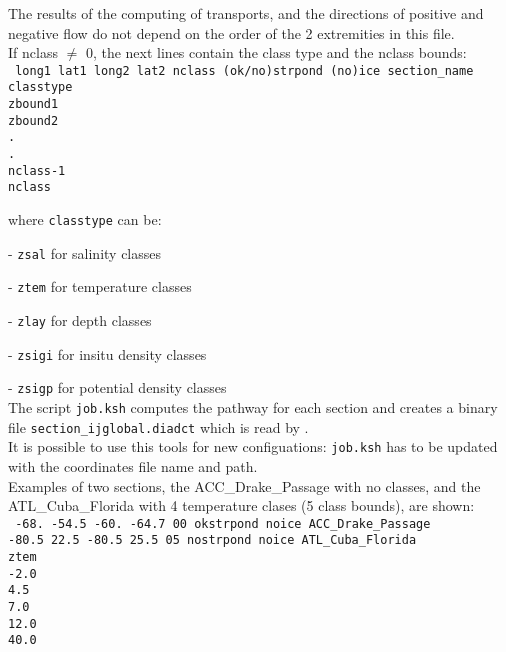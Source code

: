 \documentclass[../main/NEMO_manual]{subfiles}
\begin{document}
 \noindent The results of the computing of transports, and the directions of positive and
 negative flow do not depend on the order of the 2 extremities in this file. \\

\noindent If nclass $\neq$ 0, the next lines contain the class type and the nclass bounds: \\
{
  \texttt{
    long1 lat1 long2 lat2 nclass (ok/no)strpond (no)ice section\_name \\
    classtype                                                         \\
    zbound1                                                           \\
    zbound2                                                           \\
    .                                                                 \\
    .                                                                 \\
    nclass-1                                                          \\
    nclass}
}

\noindent where \texttt{classtype} can be:

 - \texttt{zsal}  for          salinity classes

 - \texttt{ztem}  for       temperature classes

 - \texttt{zlay}  for             depth classes

 - \texttt{zsigi} for    insitu density classes

 - \texttt{zsigp} for potential density classes \\

 The script \texttt{job.ksh} computes the pathway for each section and creates a binary file
 \texttt{section\_ijglobal.diadct} which is read by \NEMO. \\

 It is possible to use this tools for new configuations: \texttt{job.ksh} has to be updated with
 the coordinates file name and path. \\

 Examples of two sections, the ACC\_Drake\_Passage with no classes,
 and the ATL\_Cuba\_Florida with 4 temperature clases (5 class bounds), are shown: \\
 \noindent
 {
   \texttt{
     -68.    -54.5   -60.    -64.7  00 okstrpond noice ACC\_Drake\_Passage \\
     -80.5    22.5   -80.5    25.5  05 nostrpond noice ATL\_Cuba\_Florida  \\
     ztem                                                                  \\
     -2.0                                                                  \\
     4.5                                                                  \\
     7.0                                                                  \\
     12.0                                                                  \\
     40.0}
 }
\end{document}
